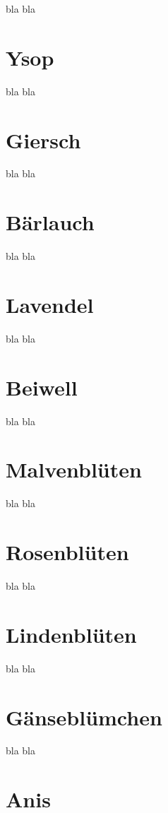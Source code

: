 bla bla

\section{Ysop}

bla bla

\section{Giersch}

bla bla

\section{Bärlauch}

bla bla

\section{Lavendel}

bla bla

\section{Beiwell}

bla bla

\section{Malvenblüten}

bla bla

\section{Rosenblüten}

bla bla

\section{Lindenblüten}

bla bla

\section{Gänseblümchen}

bla bla

\section{Anis}

